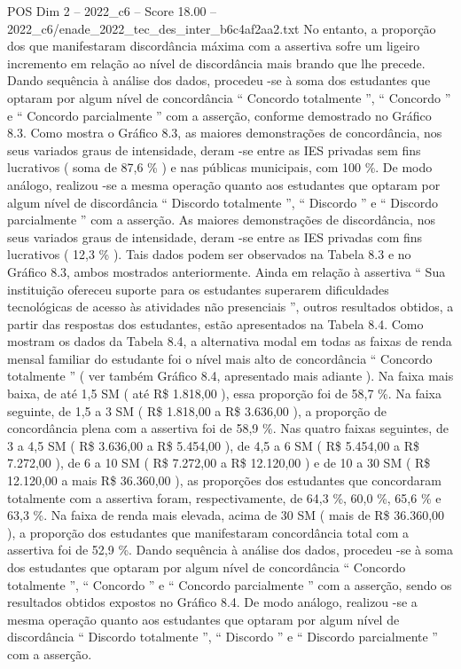 \begin{textsample}{POS Dim 2 – 2022\_c6 – Score 18.00 – 2022\_c6/enade\_2022\_tec\_des\_inter\_b6c4af2aa2.txt}
No entanto, a proporção dos que manifestaram discordância máxima com a assertiva sofre um ligeiro incremento em relação ao nível de discordância mais brando que lhe precede.
Dando sequência à análise dos dados, procedeu -se à soma dos estudantes que optaram por algum nível de concordância “ Concordo totalmente ”, “ Concordo ” e “ Concordo parcialmente ” com a asserção, conforme demostrado no Gráfico 8.3.
Como mostra o Gráfico 8.3, as maiores demonstrações de concordância, nos seus variados graus de intensidade, deram -se entre as IES privadas sem fins lucrativos ( soma de 87,6 \% ) e nas públicas municipais, com 100 \%.
De modo análogo, realizou -se a mesma operação quanto aos estudantes que optaram por algum nível de discordância “ Discordo totalmente ”, “ Discordo ” e “ Discordo parcialmente ” com a asserção.
As maiores demonstrações de discordância, nos seus variados graus de intensidade, deram -se entre as IES privadas com fins lucrativos ( 12,3 \% ).
Tais dados podem ser observados na Tabela 8.3 e no Gráfico 8.3, ambos mostrados anteriormente.
Ainda em relação à assertiva “ Sua instituição ofereceu suporte para os estudantes superarem dificuldades tecnológicas de acesso às atividades não presenciais ”, outros resultados obtidos, a partir das respostas dos estudantes, estão apresentados na Tabela 8.4.
Como mostram os dados da Tabela 8.4, a alternativa modal em todas as faixas de renda mensal familiar do estudante foi o nível mais alto de concordância “ Concordo totalmente ” ( ver também Gráfico 8.4, apresentado mais adiante ).
Na faixa mais baixa, de até 1,5 SM ( até R\$ 1.818,00 ), essa proporção foi de 58,7 \%.
Na faixa seguinte, de 1,5 a 3 SM ( R\$ 1.818,00 a R\$ 3.636,00 ), a proporção de concordância plena com a assertiva foi de 58,9 \%.
Nas quatro faixas seguintes, de 3 a 4,5 SM ( R\$ 3.636,00 a R\$ 5.454,00 ), de 4,5 a 6 SM ( R\$ 5.454,00 a R\$ 7.272,00 ), de 6 a 10 SM ( R\$ 7.272,00 a R\$ 12.120,00 ) e de 10 a 30 SM ( R\$ 12.120,00 a mais R\$ 36.360,00 ), as proporções dos estudantes que concordaram totalmente com a assertiva foram, respectivamente, de 64,3 \%, 60,0 \%, 65,6 \% e 63,3 \%.
Na faixa de renda mais elevada, acima de 30 SM ( mais de R\$ 36.360,00 ), a proporção dos estudantes que manifestaram concordância total com a assertiva foi de 52,9 \%.
Dando sequência à análise dos dados, procedeu -se à soma dos estudantes que optaram por algum nível de concordância “ Concordo totalmente ”, “ Concordo ” e “ Concordo parcialmente ” com a asserção, sendo os resultados obtidos expostos no Gráfico 8.4.
De modo análogo, realizou -se a mesma operação quanto aos estudantes que optaram por algum nível de discordância “ Discordo totalmente ”, “ Discordo ” e “ Discordo parcialmente ” com a asserção.

\end{textsample}
